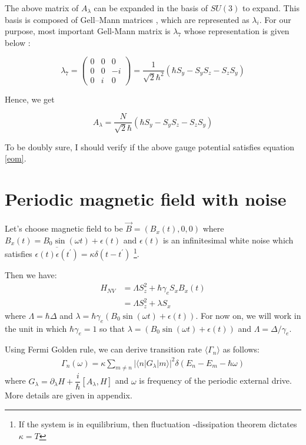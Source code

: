 \documentclass[11pt,a4paper]{article}
\begin{document}
The above matrix of $A_{\lambda}$ can be expanded in the basis of $SU(3)$ to expand. This basis is composed of Gell–Mann matrices \cite{gell1962symmetries}, which are represented as $\lambda_i$. For our purpose, most important Gell-Mann matrix is $\lambda_7$ whose representation is given below \cite{ bertlmann2008bloch, krammer2009entanglement}:

\begin{equation}
\lambda_7=
\begin{pmatrix}
0 & 0 & 0\\
0 & 0 & -i \\
0 & i & 0
\end{pmatrix}
= \dfrac{1}{\sqrt{2} \hbar^2}(\hbar S_y- S_y S_z-  S_z S_y)
\end{equation}

Hence, we get

\begin{equation}
\boxed{
A_{\lambda}=\dfrac{N}{\sqrt{2} \hbar}(\hbar S_y - S_y S_z-  S_z S_y)}
\end{equation}

To be doubly sure, I should verify if the above gauge potential satisfies equation \ref{eom}.
 
\section{Periodic magnetic field with noise}

Let's choose magnetic field to be $\vec{B}= (B_x (t), 0, 0)$ where $B_x(t)= B_0 \sin (\omega t) + \epsilon(t)$ and  $\epsilon(t)$ is an infinitesimal white noise which satisfies $\overline{ \epsilon(t) \epsilon(t^{\prime})}= \kappa \delta(t -t^{\prime})$ \footnote{If the system is in equilibrium, then fluctuation -dissipation theorem dictates $\kappa = T$}. 

Then we have: 
\begin{align*}
H_{NV} &= \Lambda S_z^2 + \hbar \gamma_e   S_x  B_x(t) \\
 &=  \Lambda S_z^2 + \lambda   S_x  
\end{align*}
where $\Lambda= \hbar \Delta $ and $\lambda=\hbar \gamma_e (B_0 \sin (\omega t) + \epsilon(t))$. For now on, we will work in the unit in which $\hbar \gamma_e =1$ so that  $\lambda= (B_0 \sin (\omega t) + \epsilon(t))$ and $\Lambda=  \Delta / \gamma_e $.

Using Fermi Golden rule, we can derive transition rate $\langle \Gamma_n \rangle$ \cite{kolodrubetz2016geometry} as follows: 
\begin{align}
 \Gamma_n (\omega) = \kappa  \sum_{m \neq n} |\langle n | G_{\lambda} | m \rangle |^2 \delta(E_n-E_m- \hbar \omega)
\end{align}
where $G_{\lambda}= \partial_{\lambda} H + \dfrac{i}{\hbar} [A_{\lambda}, H]$ and  $\omega$ is frequency of the periodic external drive. More details are given in appendix.
\end{document}

